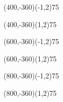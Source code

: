 \documentclass[12pt]{article}
\begin{document}
\begin{figure}[htb]
\begin{egame}
\renewcommand{\egarrowstyle}{}

\putbranch(400,-360)(-1,2){75}

\renewcommand{\egarrowstyle}{}

\putbranch(400,-360)(1,2){75}






\renewcommand{\egarrowstyle}{}

\putbranch(600,-360)(-1,2){75}

\renewcommand{\egarrowstyle}{}

\putbranch(600,-360)(1,2){75}




\renewcommand{\egarrowstyle}{e}

\putbranch(800,-360)(-1,2){75}

\renewcommand{\egarrowstyle}{e}

\putbranch(800,-360)(1,2){75}






\end{egame}
\end{figure}
\end{document}
